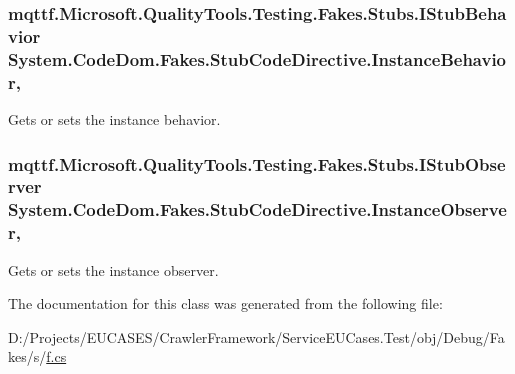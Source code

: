 \hypertarget{class_system_1_1_code_dom_1_1_fakes_1_1_stub_code_directive_ac5698aa8ce265add4a28806a3ef11c09}{
\subsubsection[{Instance\-Behavior}]{\setlength{\rightskip}{0pt plus 5cm}mqttf.\-Microsoft.\-Quality\-Tools.\-Testing.\-Fakes.\-Stubs.\-I\-Stub\-Behavior System.\-Code\-Dom.\-Fakes.\-Stub\-Code\-Directive.\-Instance\-Behavior\hspace{0.3cm}{\ttfamily [get]}, {\ttfamily [set]}}}\label{class_system_1_1_code_dom_1_1_fakes_1_1_stub_code_directive_ac5698aa8ce265add4a28806a3ef11c09}


Gets or sets the instance behavior.

\hypertarget{class_system_1_1_code_dom_1_1_fakes_1_1_stub_code_directive_add013673564a0a9d47946c6a77fe79ad}{
\subsubsection[{Instance\-Observer}]{\setlength{\rightskip}{0pt plus 5cm}mqttf.\-Microsoft.\-Quality\-Tools.\-Testing.\-Fakes.\-Stubs.\-I\-Stub\-Observer System.\-Code\-Dom.\-Fakes.\-Stub\-Code\-Directive.\-Instance\-Observer\hspace{0.3cm}{\ttfamily [get]}, {\ttfamily [set]}}}\label{class_system_1_1_code_dom_1_1_fakes_1_1_stub_code_directive_add013673564a0a9d47946c6a77fe79ad}


Gets or sets the instance observer.



The documentation for this class was generated from the following file\-:\begin{DoxyCompactItemize}
\item 
D\-:/\-Projects/\-E\-U\-C\-A\-S\-E\-S/\-Crawler\-Framework/\-Service\-E\-U\-Cases.\-Test/obj/\-Debug/\-Fakes/s/\hyperlink{s_2f_8cs}{f.\-cs}\end{DoxyCompactItemize}
